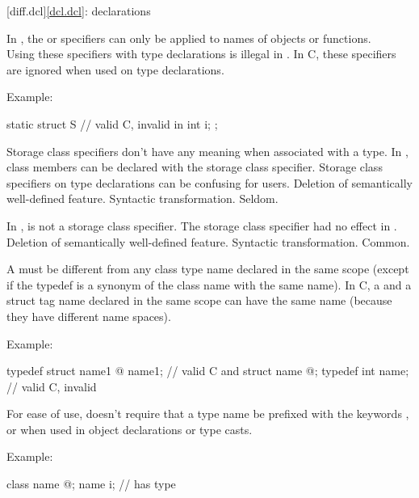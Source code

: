 [diff.dcl]{\ref{dcl.dcl}: declarations}

\change
In \Cpp{}, the  or  specifiers can only be applied to names of objects or functions.\\
Using these specifiers with type declarations is illegal in \Cpp{}.
In C, these specifiers are ignored when used on type declarations.

Example:
\begin{codeblock}
static struct S {               // valid C, invalid in \Cpp{}
  int i;
};
\end{codeblock}

\rationale
Storage class specifiers don't have any meaning when associated
with a type.
In \Cpp{}, class members can be declared with the  storage
class specifier.
Storage class specifiers on type
declarations can be confusing for users.
\effect
Deletion of semantically well-defined feature.
\difficulty
Syntactic transformation.
\howwide
Seldom.

\change
In \Cpp{},  is not a storage class specifier.
\rationale
The storage class specifier had no effect in \Cpp{}.
\effect
Deletion of semantically well-defined feature.
\difficulty
Syntactic transformation.
\howwide
Common.

\change
A \Cpp{}  must be different from any class type name declared
in the same scope (except if the typedef is a synonym of the class name with the
same name). In C, a  and a struct tag name declared in the same scope
can have the same name (because they have different name spaces).

Example:
\begin{codeblock}
typedef struct name1 { @\commentellip@ } name1;         // valid C and \Cpp{}
struct name { @\commentellip@ };
typedef int name;               // valid C, invalid \Cpp{}
\end{codeblock}

\rationale
For ease of use, \Cpp{} doesn't require that a type name be prefixed
with the keywords ,  or  when used in object
declarations or type casts.

Example:
\begin{codeblock}
class name { @\commentellip@ };
name i;                         //  has type 
\end{codeblock}

